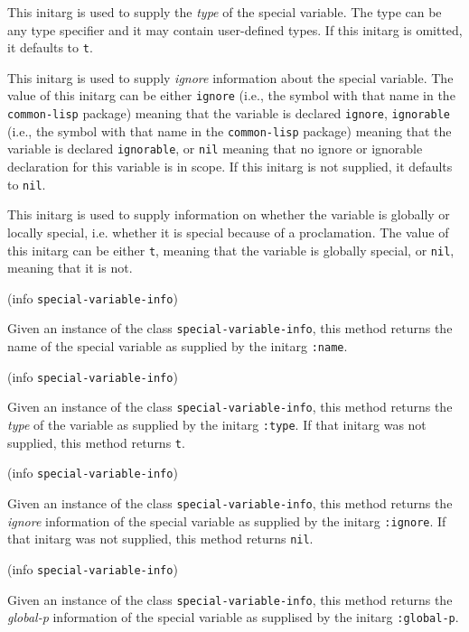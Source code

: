 This initarg is used to supply the \emph{type} of the special
variable.  The type can be any type specifier and it may contain
user-defined types.  If this initarg is omitted, it defaults to
\texttt{t}. 


This initarg is used to supply \emph{ignore} information about the
special variable.  The value of this initarg can be either
\texttt{ignore} (i.e., the symbol with that name in the
\texttt{common-lisp} package) meaning that the variable is declared
\texttt{ignore}, \texttt{ignorable} (i.e., the symbol with that name
in the \texttt{common-lisp} package) meaning that the variable is
declared \texttt{ignorable}, or \texttt{nil} meaning that no ignore or
ignorable declaration for this variable is in scope.  If this initarg
is not supplied, it defaults to \texttt{nil}.


This initarg is used to supply information on whether the variable is globally or locally special, i.e. whether it is special because of a proclamation. The value of this initarg can be either \texttt{t}, meaning that the variable is globally special, or \texttt{nil}, meaning that it is not.

 {(info {\tt special-variable-info})}

Given an instance of the class \texttt{special-variable-info}, this
method returns the name of the special variable as supplied by the
initarg \texttt{:name}.

 {(info {\tt special-variable-info})}

Given an instance of the class \texttt{special-variable-info}, this
method returns the \emph{type} of the variable as supplied by the
initarg \texttt{:type}.  If that initarg was not supplied, this method
returns \texttt{t}.

 {(info {\tt special-variable-info})}

Given an instance of the class \texttt{special-variable-info}, this
method returns the \emph{ignore} information of the special variable as
supplied by the initarg \texttt{:ignore}.  If that initarg was not
supplied, this method returns \texttt{nil}.

 {(info {\tt special-variable-info})}

Given an instance of the class \texttt{special-variable-info}, this method returns the \emph{global-p} information of the special variable as supplised by the initarg \texttt{:global-p}.

